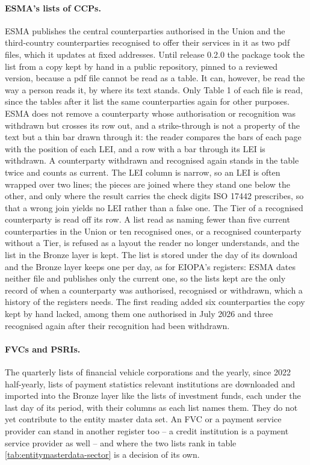 \paragraph{ESMA's lists of CCPs.} ESMA publishes the central counterparties authorised in the Union and the third-country counterparties recognised to offer their services in it as two pdf files, which it updates at fixed addresses. Until release 0.2.0 the package took the list from a copy kept by hand in a public repository, pinned to a reviewed version, because a pdf file cannot be read as a table. It can, however, be read the way a person reads it, by where its text stands. Only Table 1 of each file is read, since the tables after it list the same counterparties again for other purposes. ESMA does not remove a counterparty whose authorisation or recognition was withdrawn but crosses its row out, and a strike-through is not a property of the text but a thin bar drawn through it: the reader compares the bars of each page with the position of each LEI, and a row with a bar through its LEI is withdrawn. A counterparty withdrawn and recognised again stands in the table twice and counts as current. The LEI column is narrow, so an LEI is often wrapped over two lines; the pieces are joined where they stand one below the other, and only where the result carries the check digits ISO 17442 prescribes, so that a wrong join yields no LEI rather than a false one. The Tier of a recognised counterparty is read off its row. A list read as naming fewer than five current counterparties in the Union or ten recognised ones, or a recognised counterparty without a Tier, is refused as a layout the reader no longer understands, and the list in the Bronze layer is kept. The list is stored under the day of its download and the Bronze layer keeps one per day, as for EIOPA's registers: ESMA dates neither file and publishes only the current one, so the lists kept are the only record of when a counterparty was authorised, recognised or withdrawn, which a history of the registers needs. The first reading added six counterparties the copy kept by hand lacked, among them one authorised in July 2026 and three recognised again after their recognition had been withdrawn.

\paragraph{FVCs and PSRIs.} The quarterly lists of financial vehicle corporations and the yearly, since 2022 half-yearly, lists of payment statistics relevant institutions are downloaded and imported into the Bronze layer like the lists of investment funds, each under the last day of its period, with their columns as each list names them. They do not yet contribute to the entity master data set. An FVC or a payment service provider can stand in another register too -- a credit institution is a payment service provider as well -- and where the two lists rank in table \ref{tab:entitymasterdata-sector} is a decision of its own.


